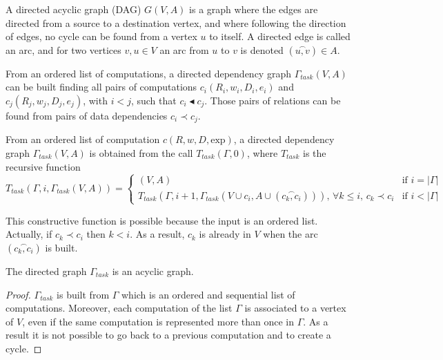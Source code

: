 \begin{mydef}
A directed acyclic graph (DAG) $G(V,A)$ is a graph where the edges are directed from a source to a destination vertex, and where following the direction of edges, no cycle can be found from a vertex $u$ to itself. A directed edge is called an arc, and for two vertices $v,u \in V$ an arc from $u$ to $v$ is denoted $(\overset{\frown}{u,v}) \in A$.
\end{mydef}

From an ordered list of computations, a directed dependency graph $\Gamma_{task}(V,A)$ can be built finding all pairs of computations $c_i(R_i,w_i,D_i,e_i)$ and $c_j(R_j,w_j,D_j,e_j)$, with $i<j$, such that $c_i \blacktriangleleft c_j$. Those pairs of relations can be found from pairs of data dependencies $c_i \prec c_j$.

\begin{mydef}
From an ordered list of computation $c(R,w,D,\text{exp})$, a directed dependency graph $\Gamma_{task}(V,A)$ is obtained from the call $T_{task}(\Gamma,0)$, where $T_{task}$ is the recursive function
\begin{equation*}
T_{task}(\Gamma,i,\Gamma_{task}(V,A)) = 
\begin{cases} 	(V,A) & \mbox{if }i=|\Gamma|\\
				T_{task}(\Gamma,i+1,\Gamma_{task}(V\cup c_i, A\cup (\overset{\frown}{c_k,c_i})))\mbox{, }\forall k \leq i \mbox{, } c_k\prec c_i & \mbox{if }i<|\Gamma|
\end{cases}
\end{equation*}
\end{mydef}

This constructive function is possible because the input is an ordered list. Actually, if $c_k\prec c_i$ then $k<i$. As a result, $c_k$ is already in $V$ when the arc $(\overset{\frown}{c_k,c_i})$ is built. 

\begin{myprop}
The directed graph $\Gamma_{task}$ is an acyclic graph.
\end{myprop}

\begin{proof}
$\Gamma_{task}$ is built from $\Gamma$ which is an ordered and sequential list of computations. Moreover, each computation of the list $\Gamma$ is associated to a vertex of $V$, even if the same computation is represented more than once in $\Gamma$. As a result it is not possible to go back to a previous computation and to create a cycle.
\end{proof}

